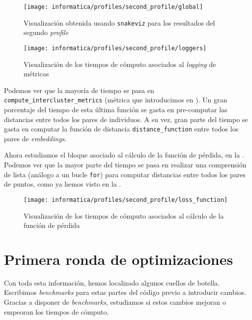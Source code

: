 \begin{figure}[!hbtp]
	\centering
	\texttt{[image: informatica/profiles/second\_profile/global]}
	\caption{Visualización obtenida usando \lstinline{snakeviz} para los resultados del segundo \textit{profile}}
	\label{img:optimizacion_02}
\end{figure}

\begin{figure}[!hbtp]
	\centering
	\texttt{[image: informatica/profiles/second\_profile/loggers]}
	\caption{Visualización de los tiempos de cómputo asociados al \textit{logging} de métricas}
	\label{img:second_profile_tiempos_metricas}
\end{figure}

Podemos ver que la mayoría de tiempo se pasa en \lstinline{compute_intercluster_metrics} (métrica que introducimos en ). Un gran porcentaje del tiempo de esta última función se gasta en pre-computar las distancias entre todos los pares de individuos. A su vez, gran parte del tiempo se gasta en computar la función de distancia \lstinline{distance_function} entre todos los pares de \textit{embeddings}.

Ahora estudiamos el bloque asociado al cálculo de la función de pérdida, en la . Podemos ver que la mayor parte del tiempo se pasa en realizar una comprensión de lista (análogo a un bucle \lstinline{for}) para computar distancias entre todos los pares de puntos, como ya hemos visto en la .

\begin{figure}[!hbtp]
	\centering
	\texttt{[image: informatica/profiles/second\_profile/loss\_function]}
	\caption{Visualización de los tiempos de cómputo asociados al cálculo de la función de pérdida}
	\label{img:optimizacion_03}
\end{figure}

\section{Primera ronda de optimizaciones}

Con toda esta información, hemos localizado algunos cuellos de botella. Escribimos \textit{benchmarks} para estas partes del código previo a introducir cambios. Gracias a disponer de \textit{benchmarks}, estudiamos si estos cambios mejoran o empeoran los tiempos de cómputo.

